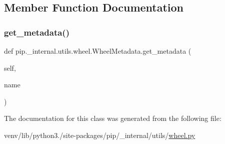 \subsection{Member Function Documentation}
\mbox{\label{classpip_1_1__internal_1_1utils_1_1wheel_1_1WheelMetadata_afbb2b63eda7ab55b3df3b0f98469a5c5}} 
\subsubsection{\texorpdfstring{get\+\_\+metadata()}{get\_metadata()}}
{\footnotesize\ttfamily def pip.\+\_\+internal.\+utils.\+wheel.\+Wheel\+Metadata.\+get\+\_\+metadata (\begin{DoxyParamCaption}\item[{}]{self,  }\item[{}]{name }\end{DoxyParamCaption})}



The documentation for this class was generated from the following file\+:\begin{DoxyCompactItemize}
\item 
venv/lib/python3./site-\/packages/pip/\+\_\+internal/utils/\hyperlink{pip_2__internal_2utils_2wheel_8py}{wheel.\+py}\end{DoxyCompactItemize}
